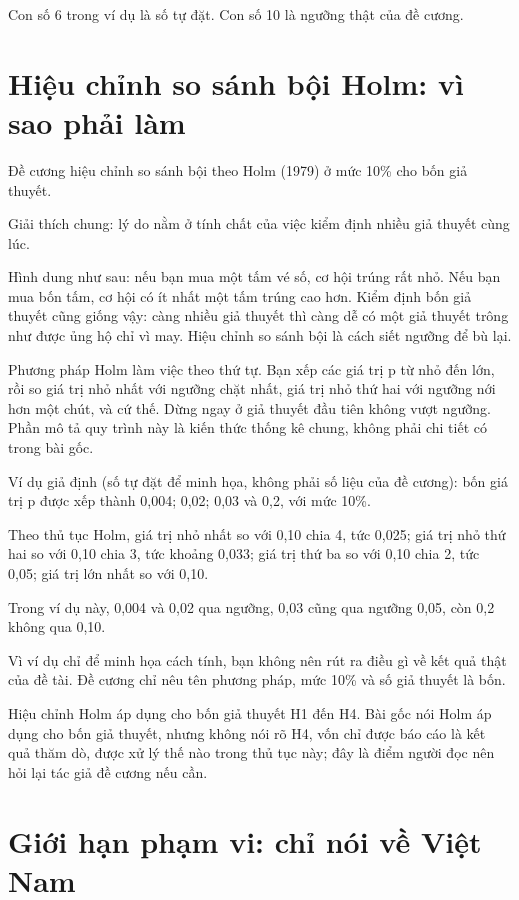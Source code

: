 Con số 6 trong ví dụ là số tự đặt. Con số 10 là ngưỡng thật của đề cương.

\section{Hiệu chỉnh so sánh bội Holm: vì sao phải làm}

Đề cương hiệu chỉnh so sánh bội theo Holm (1979) ở mức 10\% cho bốn giả thuyết.

Giải thích chung: lý do nằm ở tính chất của việc kiểm định nhiều giả thuyết cùng lúc.

Hình dung như sau: nếu bạn mua một tấm vé số, cơ hội trúng rất nhỏ. Nếu bạn mua bốn tấm, cơ hội có ít nhất một tấm trúng cao hơn. Kiểm định bốn giả thuyết cũng giống vậy: càng nhiều giả thuyết thì càng dễ có một giả thuyết trông như được ủng hộ chỉ vì may. Hiệu chỉnh so sánh bội là cách siết ngưỡng để bù lại.

Phương pháp Holm làm việc theo thứ tự. Bạn xếp các giá trị p từ nhỏ đến lớn, rồi so giá trị nhỏ nhất với ngưỡng chặt nhất, giá trị nhỏ thứ hai với ngưỡng nới hơn một chút, và cứ thế. Dừng ngay ở giả thuyết đầu tiên không vượt ngưỡng. Phần mô tả quy trình này là kiến thức thống kê chung, không phải chi tiết có trong bài gốc.

\begin{tcolorbox}[breakable]
Ví dụ giả định (số tự đặt để minh họa, không phải số liệu của đề cương): bốn giá trị p được xếp thành 0,004; 0,02; 0,03 và 0,2, với mức 10\%.

Theo thủ tục Holm, giá trị nhỏ nhất so với 0,10 chia 4, tức 0,025; giá trị nhỏ thứ hai so với 0,10 chia 3, tức khoảng 0,033; giá trị thứ ba so với 0,10 chia 2, tức 0,05; giá trị lớn nhất so với 0,10.

Trong ví dụ này, 0,004 và 0,02 qua ngưỡng, 0,03 cũng qua ngưỡng 0,05, còn 0,2 không qua 0,10.
\end{tcolorbox}

Vì ví dụ chỉ để minh họa cách tính, bạn không nên rút ra điều gì về kết quả thật của đề tài. Đề cương chỉ nêu tên phương pháp, mức 10\% và số giả thuyết là bốn.

Hiệu chỉnh Holm áp dụng cho bốn giả thuyết H1 đến H4. Bài gốc nói Holm áp dụng cho bốn giả thuyết, nhưng không nói rõ H4, vốn chỉ được báo cáo là kết quả thăm dò, được xử lý thế nào trong thủ tục này; đây là điểm người đọc nên hỏi lại tác giả đề cương nếu cần.

\section{Giới hạn phạm vi: chỉ nói về Việt Nam}

